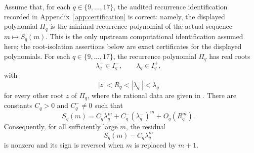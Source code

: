 \begin{theorem}
\label{thm:alternating-window-q9-17}
Assume that, for each \(q\in\{9,\dots,17\}\), the audited recurrence
identification recorded in Appendix~\ref{app:certification} is correct: namely,
the displayed polynomial \(\Pi_q\) is the minimal recurrence polynomial of the
actual sequence \(m\mapsto S_q(m)\).  This is the only upstream computational
identification assumed here; the root-isolation assertions below are exact
certificates for the displayed polynomials.
For each \(q\in\{9,\dots,17\}\), the recurrence polynomial \(\Pi_q\) has
real roots
\[
  \lambda_q^-\in I_q^-,
  \qquad
  \lambda_q\in I_q^+,
\]
with
\[
  |z|<R_q<|\lambda_q^-|<\lambda_q
\]
for every other root \(z\) of \(\Pi_q\), where the rational data are given in
.  There are constants
\(C_q>0\) and \(C_q^-\ne0\) such that
\[
  S_q(m)
  =C_q\lambda_q^m+C_q^-(\lambda_q^-)^m+O_q(R_q^m).
\]
Consequently, for all sufficiently large \(m\), the residual
\[
  S_q(m)-C_q\lambda_q^m
\]
is nonzero and its sign is reversed when \(m\) is replaced by \(m+1\).
\end{theorem}

